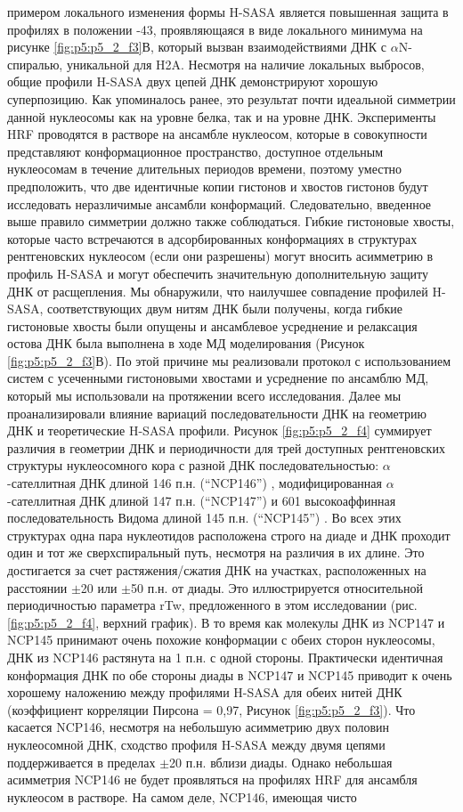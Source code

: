 примером локального изменения формы H-SASA является повышенная защита в профилях в положении -43, проявляющаяся в виде локального минимума на рисунке \ref{fig:p5:p5_2_f3}В, который вызван взаимодействиями ДНК с $\alpha$N-спиралью, уникальной для H2A. Несмотря на наличие локальных выбросов, общие профили H-SASA двух цепей ДНК демонстрируют хорошую суперпозицию. Как упоминалось ранее, это результат почти идеальной симметрии данной нуклеосомы как на уровне белка, так и на уровне ДНК. Эксперименты HRF проводятся в растворе на ансамбле нуклеосом, которые в совокупности представляют конформационное пространство, доступное отдельным нуклеосомам в течение длительных периодов времени, поэтому уместно предположить, что две идентичные копии гистонов и хвостов гистонов будут исследовать неразличимые ансамбли конформаций. Следовательно, введенное выше правило симметрии должно также соблюдаться. Гибкие гистоновые хвосты, которые часто встречаются в адсорбированных конформациях в структурах рентгеновских нуклеосом (если они разрешены) могут вносить асимметрию в профиль H-SASA и могут обеспечить значительную дополнительную защиту ДНК от расщепления. Мы обнаружили, что наилучшее совпадение профилей H-SASA, соответствующих двум нитям ДНК были получены, когда гибкие гистоновые хвосты были опущены и ансамблевое усреднение и релаксация остова ДНК была выполнена в ходе МД моделирования (Рисунок \ref{fig:p5:p5_2_f3}В). По этой причине мы реализовали протокол с использованием систем с усеченными гистоновыми хвостами и усреднение по ансамблю МД, который мы использовали на протяжении всего исследования. Далее мы проанализировали влияние вариаций последовательности ДНК на геометрию ДНК и теоретические H-SASA профили. Рисунок \ref{fig:p5:p5_2_f4} суммирует различия в геометрии ДНК и периодичности для трей доступных рентгеновских структуры нуклеосомного кора с разной ДНК последовательностью: $\alpha$-сателлитная ДНК длиной 146 п.н.  (``NCP146'') \cite{luger_crystal_1997}, модифицированная $\alpha$-сателлитная ДНК длиной 147 п.н. (``NCP147'') \cite{davey_solvent_2002}  и 601 высокоаффинная последовательность Видома длиной 145 п.н. (``NCP145'') \cite{lowary_new_1998,vasudevan_crystal_2010}. Во всех этих структурах одна пара нуклеотидов расположена строго на диаде и ДНК проходит один и тот же сверхспиральный путь, несмотря на различия в их длине. Это достигается за счет растяжения/сжатия ДНК на участках, расположенных на расстоянии $\pm$20 или $\pm$50 п.н. от диады. Это иллюстрируется относительной периодичностью параметра rTw, предложенного в этом исследовании (рис. \ref{fig:p5:p5_2_f4}, верхний график). В то время как молекулы ДНК из NCP147 и NCP145 принимают очень похожие конформации с обеих сторон нуклеосомы, ДНК из NCP146 растянута на 1 п.н. с одной стороны. Практически идентичная конформация ДНК по обе стороны диады в NCP147 и NCP145 приводит к очень хорошему наложению между профилями H-SASA для обеих нитей ДНК (коэффициент корреляции Пирсона = 0,97, Рисунок \ref{fig:p5:p5_2_f3}). Что касается NCP146, несмотря на небольшую асимметрию двух половин нуклеосомной ДНК, сходство профиля H-SASA между двумя цепями поддерживается в пределах $\pm$20 п.н. вблизи диады. Однако небольшая асимметрия NCP146 не будет проявляться на профилях HRF для ансамбля нуклеосом в растворе. На самом деле, NCP146, имеющая чисто 
